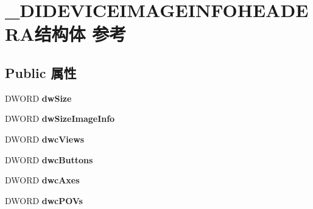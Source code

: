 \hypertarget{struct___d_i_d_e_v_i_c_e_i_m_a_g_e_i_n_f_o_h_e_a_d_e_r_a}{}\section{\+\_\+\+D\+I\+D\+E\+V\+I\+C\+E\+I\+M\+A\+G\+E\+I\+N\+F\+O\+H\+E\+A\+D\+E\+R\+A结构体 参考}
\label{struct___d_i_d_e_v_i_c_e_i_m_a_g_e_i_n_f_o_h_e_a_d_e_r_a}
\subsection*{Public 属性}
\begin{DoxyCompactItemize}
\item 
\mbox{\label{struct___d_i_d_e_v_i_c_e_i_m_a_g_e_i_n_f_o_h_e_a_d_e_r_a_a82de0622a3d340ef22e4503eabc869c2}} 
D\+W\+O\+RD {\bfseries dw\+Size}
\item 
\mbox{\label{struct___d_i_d_e_v_i_c_e_i_m_a_g_e_i_n_f_o_h_e_a_d_e_r_a_a0eb1705f79625c5fa63b8daa6001b51b}} 
D\+W\+O\+RD {\bfseries dw\+Size\+Image\+Info}
\item 
\mbox{\label{struct___d_i_d_e_v_i_c_e_i_m_a_g_e_i_n_f_o_h_e_a_d_e_r_a_ac5bae9ae744982a1f5c86191a6f8692e}} 
D\+W\+O\+RD {\bfseries dwc\+Views}
\item 
\mbox{\label{struct___d_i_d_e_v_i_c_e_i_m_a_g_e_i_n_f_o_h_e_a_d_e_r_a_a9dac81e5a6bb0af3b4a139183f0dc62c}} 
D\+W\+O\+RD {\bfseries dwc\+Buttons}
\item 
\mbox{\label{struct___d_i_d_e_v_i_c_e_i_m_a_g_e_i_n_f_o_h_e_a_d_e_r_a_a4a8407f84ad0d8eb1743f617bf7904f8}} 
D\+W\+O\+RD {\bfseries dwc\+Axes}
\item 
\mbox{\label{struct___d_i_d_e_v_i_c_e_i_m_a_g_e_i_n_f_o_h_e_a_d_e_r_a_a0272ef28899acd29b304a9243ee02e12}} 
D\+W\+O\+RD {\bfseries dwc\+P\+O\+Vs}
\item 

\end{DoxyCompactItemize}
